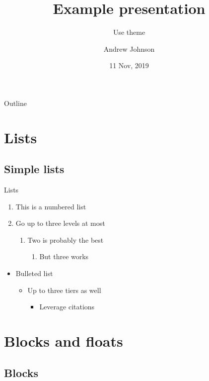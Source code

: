 \documentclass{beamer}
\title{Example presentation}
\subtitle{Use theme}
\author{Andrew Johnson}
\institute[Georgia Tech]{Georgia Institute of Technology}
\date{11 Nov, 2019}
\begin{document}
\frame{\titlepage}

\begin{frame}{Outline}
    \tableofcontents
\end{frame}

\section{Lists}

\frame{\sectionpage}

\subsection{Simple lists}

\begin{frame}{Lists}
    \begin{enumerate}
        \item{This is a numbered list}
        \item{Go up to three levels at most}
            \begin{enumerate}
                \item{Two is probably the best}
                    \begin{enumerate}
                        \item{But three works}
                    \end{enumerate}
            \end{enumerate}
    \end{enumerate}
    \begin{itemize}
        \item{Bulleted list}
            \begin{itemize}
                \item{Up to three tiers as well}
                    \begin{itemize}
                        \item{Leverage citations \cite{burdell_1999}}
                    \end{itemize}
            \end{itemize}
    \end{itemize}
\end{frame}

\section{Blocks and floats}

\subsection{Blocks}
\end{document}
